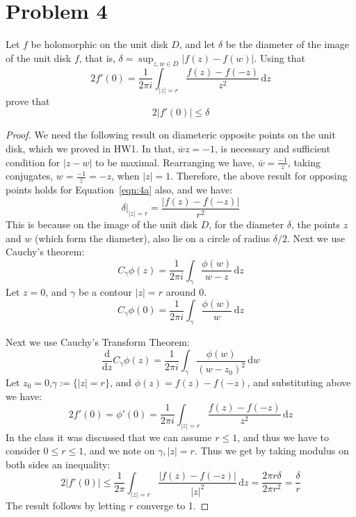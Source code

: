 \documentclass{article}[12pt]
\def\D{\mathrm{d}}
\begin{document}
\section*{Problem 4}Let $f$ be holomorphic on the unit disk $D$, and let
$\delta$ be the diameter of the image of the unit disk $f$, that is,
$\delta=\sup_{z,w \in D}|f(z)-f(w)|$. Using that
\begin{equation}
2f'(0) = \frac{1}{2\pi i} \int_{|z|=r} \frac{f(z)-f(-z)}{z^2}\, \D z\label{eqn:4a}
\end{equation}
prove that
\[
2|f'(0)| \le \delta
\]
\begin{proof}
  We need the following result on diameteric opposite points on the
  unit disk, which we proved in HW1. In that, $\overline{w}z=-1$,
  is necessary and sufficient condition for $|z-w|$ to be maximal.
  Rearranging we have, $\overline{w}=\frac{-1}{z}$, taking conjugates,
  $w=\frac{-1}{\overline{z}}=-z$, when $|z|=1$. 
  Therefore, the above result for opposing
  points holds for Equation~\ref{eqn:4a} also, and we have:
  \begin{equation}
    \delta|_{|z|=r}=\frac{|f(z)-f(-z)|}{r^2} \label{eqn:4b}
  \end{equation}
  This is because
  on the image of the unit disk $D$, for the diameter $\delta$, the points
  $z$ and $w$ (which form the diameter), also lie on a circle of radius
  $\delta/2$.
  Next we use Cauchy's theorem:
  \begin{equation}
    C_\gamma \phi(z) = \frac{1}{2\pi i} \int_\gamma \frac{\phi(w)}{w-z}\,\D z \label{eqn:cauchy}
  \end{equation}
  Let $z=0$, and $\gamma$ be a contour $|z|=r$ around 0.
  \begin{equation}
    C_\gamma \phi(0) = \frac{1}{2\pi i} \int_\gamma \frac{\phi(w)}{w}\,\D z \label{eqn:cauchy2}
  \end{equation}
  
  Next we use Cauchy's Transform Theorem:
  \[
  \frac{\D}{\D z} C_\gamma \phi(z) = \frac{1}{2\pi i} \int_\gamma
  \frac{\phi(w)}{(w-z_0)^2}\,\D w
  \]
  Let $z_0=0$,$\gamma:=\{|z|=r\}$,
  and $\phi(z)=f(z)-f(-z)$, and substituting above we have:
  \[
  2f'(0) = \phi'(0) = 
  \frac{1}{2\pi i} \int_{|z|=r} \frac{f(z)-f(-z)}{z^2}\,\D z
  \]
  In the class it was discussed that we can assume $r\le 1$, and thus
  we have to consider $0 \le r \le 1$, and we note on $\gamma, |z|=r$.
  Thus we get by taking modulus on both sides an inequality:
  \[
  2|f'(0)| \le \frac{1}{2\pi} \int_{|z|=r} \frac{|f(z)-f(-z)|}{|z|^2}\,\D z =
  \frac{2 \pi r\delta }{2\pi r^2}  = \frac{\delta}{r}
  \]
  The result follows by letting $r$ converge to 1.

\end{proof}
\end{document}
